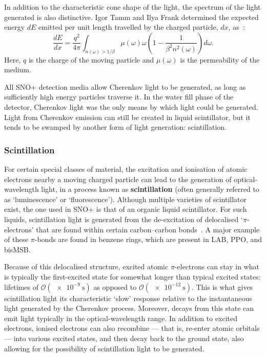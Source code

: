 In addition to the characteristic cone shape of the light, the spectrum of the light generated is also distinctive. Igor Tamm and Ilya Frank determined the expected energy $dE$ emitted per unit length travelled by the charged particle, $dx$, as~\cite{frankCoherentVisibleRadiation1937}: %
\begin{equation}
    \frac{dE}{dx} = 
    \frac{q^2}{4\pi}\int_{n(\omega)>1/\beta}\mu(\omega)\omega\left(1-\frac{1}{\beta^{2}n^{2}(\omega)}\right)d\omega.
\end{equation}
Here, $q$ is the charge of the moving particle and $\mu(\omega)$ is the permeability of the medium.

All SNO+ detection media allow Cherenkov light to be generated, as long as sufficiently high energy particles traverse it. In the water fill phase of the detector, Cherenkov light was the only means by which light could be generated. Light from Cherenkov emission can still be created in liquid scintillator, but it tends to be swamped by another form of light generation: scintillation.
\subsubsection{Scintillation}\label{sec:scintillation}
For certain special classes of material, the excitation and ionisation of atomic electrons nearby a moving charged particle can lead to the generation of optical-wavelength light, in a process known as \textbf{scintillation} (often generally referred to as `luminescence' or `fluorescence'). Although multiple varieties of scintillator exist, the one used in SNO+ is that of an organic liquid scintillator. For such liquids, scintillation light is generated from the de-excitation of delocalised `$\pi$-electrons' that are found within certain carbon--carbon bonds~\cite{birksChapterScintillationProcess1967}. A major example of these $\pi$-bonds are found in benzene rings, which are present in LAB, PPO, and bisMSB.

Because of this delocalised structure, excited atomic $\pi$-electrons can stay in what is typically the first-excited state for somewhat longer than typical excited states: lifetimes of $\mathcal{O}(\SI{e-9}{\second})$ as opposed to $\mathcal{O}(\SI{e-12}{\second})$. This is what gives scintillation light its characteristic `slow' response relative to the instantaneous light generated by the Cherenkov process. Moreover, decays from this state can emit light typically in the optical-wavelength range. In addition to excited electrons, ionised electrons can also recombine --- that is, re-enter atomic orbitals --- into various excited states, and then decay back to the ground state, also allowing for the possibility of scintillation light to be generated.

